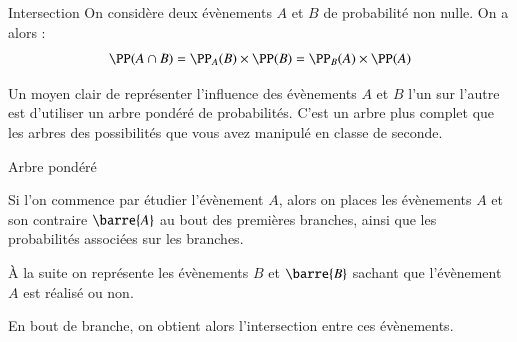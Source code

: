 \documentclass[oneside,12pt]{article}          %
\begin{document}
\begin{propriete}{Intersection}
	On considère deux évènements $A$ et $B$ de probabilité non nulle. On a alors :
	\[ \PP(A \cap B) = \PP_A(B) \times \PP(B) = \PP_B(A) \times \PP(A) \]
\end{propriete}



Un moyen clair de représenter l'influence des évènements $A$ et $B$ l'un sur l'autre est d'utiliser un arbre pondéré de probabilités. C'est un arbre plus complet que les arbres des possibilités que vous avez manipulé en classe de seconde.

\begin{definition}{Arbre pondéré}
	\begin{minipage}{0.5\linewidth} \restoreskip \vspace{0pt}
		Si l'on commence par étudier l'évènement $A$, alors on places les évènements $A$ et son contraire $\barre{A}$ au bout des premières branches, ainsi que les probabilités associées sur les branches.
		
		À la suite on représente les évènements $B$ et $\barre{B}$ sachant que l'évènement $A$ est réalisé ou non.
		
		En bout de branche, on obtient alors l'intersection entre ces évènements.
	\end{minipage} \hspace{5mm}
	\begin{minipage}{0.5\linewidth}
	\end{minipage}
\end{definition}
\end{document}

